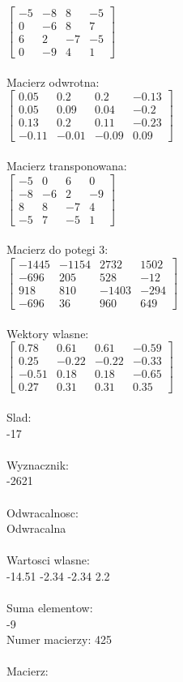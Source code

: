 \documentclass[a4paper,12pt]{article}
\begin{document}
$\begin{bmatrix} -5&-8&8&-5\\0&-6&8&7\\6&2&-7&-5\\0&-9&4&1 \end{bmatrix}$
\\
\\
Macierz odwrotna:\\

$\begin{bmatrix} 0.05&0.2&0.2&-0.13\\0.05&0.09&0.04&-0.2\\0.13&0.2&0.11&-0.23\\-0.11&-0.01&-0.09&0.09 \end{bmatrix}$
\\
\\
Macierz transponowana:\\

$\begin{bmatrix} -5&0&6&0\\-8&-6&2&-9\\8&8&-7&4\\-5&7&-5&1 \end{bmatrix}$
\\
\\
Macierz do potegi 3:\\

$\begin{bmatrix} -1445&-1154&2732&1502\\-696&205&528&-12\\918&810&-1403&-294\\-696&36&960&649 \end{bmatrix}$
\\
\\
Wektory wlasne:\\

$\begin{bmatrix} 0.78&0.61&0.61&-0.59\\0.25&-0.22&-0.22&-0.33\\-0.51&0.18&0.18&-0.65\\0.27&0.31&0.31&0.35 \end{bmatrix}$
\\
\\
Slad:\\
-17
\\
\\
Wyznacznik:\\
-2621
\\
\\
Odwracalnosc:\\
Odwracalna
\\
\\
Wartosci wlasne:\\
-14.51 -2.34 -2.34 2.2
\\
\\
Suma elementow:\\
-9
\\
\newpage
Numer macierzy:
425
\\
\\
Macierz:\\
\end{document}
